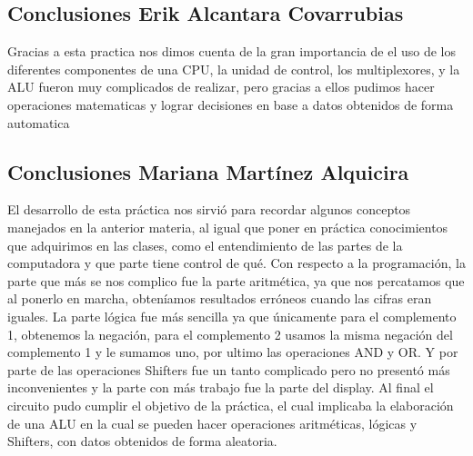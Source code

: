 	\subsection{Conclusiones Erik Alcantara Covarrubias }
Gracias a esta practica nos dimos cuenta de la gran importancia de el uso de los diferentes componentes de una CPU, la unidad de control, los multiplexores, y la ALU fueron muy complicados de realizar, pero gracias a ellos pudimos hacer operaciones matematicas y lograr decisiones en base a datos obtenidos de forma automatica
	\subsection{Conclusiones Mariana Mart\'inez Alquicira}
	El desarrollo de esta pr\'actica nos sirvi\'o para recordar algunos conceptos manejados en la anterior materia, al igual que poner en pr\'actica conocimientos que adquirimos en las clases, como el entendimiento de las partes de la computadora y que parte tiene control de qu\'e.
Con respecto a la programaci\'on, la parte que m\'as se nos complico fue la parte aritm\'etica, ya que nos percatamos que al ponerlo en marcha, obten\'iamos resultados err\'oneos cuando las cifras eran iguales. La parte l\'ogica fue m\'as sencilla ya que \'unicamente para el complemento 1, obtenemos la negaci\'on, para el complemento 2 usamos la misma negaci\'on del complemento 1 y le sumamos uno, por ultimo las operaciones AND y OR. Y por parte de las operaciones Shifters fue un tanto complicado pero no present\'o m\'as inconvenientes y la parte con m\'as trabajo fue la parte del display.
Al final el circuito pudo cumplir el objetivo de la pr\'actica, el cual implicaba la elaboraci\'on de una ALU en la cual se pueden hacer operaciones aritm\'eticas, l\'ogicas y Shifters, con datos obtenidos de forma aleatoria.